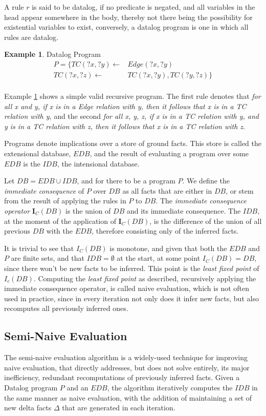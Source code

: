 \documentclass[sigconf,screen,review=false,natbib]{acmart}
\theoremstyle{definition}
\newtheorem{exmp}{Example}[section]
\begin{document}
A rule $r$ is said to be datalog, if no predicate is negated, and all variables in the head appear somewhere in the body,
thereby not there being the possibility for existential variables to exist, conversely, a datalog program is one in which
all rules are datalog.
\begin{exmp}{Datalog Program}\label{ex1}
	\begin{align*}
		P = \{TC(?x, ?y) \leftarrow & Edge(?x, ?y)              \\
		TC(?x, ?z) \leftarrow       & TC(?x, ?y), TC(?y, ?z) \} \\
	\end{align*}
\end{exmp}
Example \ref{ex1} shows a simple valid recursive program. The first rule denotes that \textit{for all x and y, if x is
	in a Edge relation with y, then it follows that x is in a TC relation with y}, and the second \textit{for all x, y, z, if
	x is in a TC relation with y, and y is in a TC relation with z, then it follows that x is in a TC relation with z}.

Programs denote implications over a store of ground facts. This store is called the extensional database, $EDB$, and the result
of evaluating a program over some $EDB$ is the $IDB$, the intensional database.

Let $DB = EDB \cup IDB$, and for there to be a program $P$. We define the \textit{immediate consequence} of $P$ over $DB$ as
all facts that are either in $DB$, or stem from the result of applying the rules in $P$ to $DB$. The \textit{immediate consequence operator}
$\textbf{I}_C(DB)$ is the union of $DB$ and its immediate consequence. The $IDB$, at the moment of the application of $\textbf{I}_C(DB)$, is
the difference of the union of all previous $DB$ with the $EDB$, therefore consisting only of the inferred facts.

It is trivial to see that $I_C(DB)$ is monotone, and given that both the $EDB$ and $P$ are finite sets, and
that $IDB = \emptyset$ at the start, at some point $I_C(DB) = DB$, since there won't be new facts to be inferred. This
point is the \textit{least fixed point} of $I_c(DB)$\cite{datalog}. Computing the \textit{least fixed point} as
described, recursively applying the immediate consequence operator, is called naive evaluation, which is not often
used in practice, since in every iteration not only does it infer new facts, but also recomputes all previously
inferred ones.
\subsection{Semi-Naive Evaluation}
The semi-naive evaluation algorithm \cite{datalog} is a widely-used technique for improving naive evaluation,
that directly addresses, but does not solve entirely, its major inefficiency, redundant recomputations of previously
inferred facts. Given a Datalog program $P$ and an $EDB$, the algorithm iteratively computes the $IDB$ in the same manner
as naive evaluation, with the addition of maintaining a set of new delta facts $\Delta$ that are generated in each
iteration.
\end{document}

